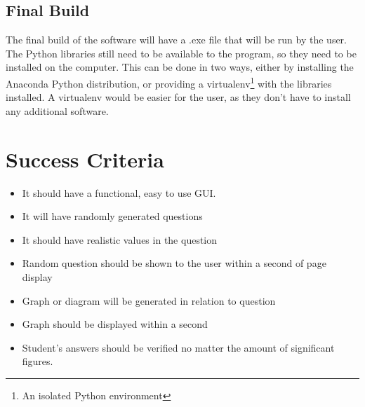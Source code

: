 \subsection{Final Build}
The final build of the software will have a .exe file that will be run by the user. The Python libraries still need to be available to the program, so they need to be installed on the computer. This can be done in two ways, either by installing the Anaconda Python distribution, or providing a virtualenv\footnote{An isolated Python environment} with the libraries installed. A virtualenv would be easier for the user, as they don't have to install any additional software.
\section{Success Criteria}
\begin{itemize}
	\item It should have a functional, easy to use GUI.
	\item It will have randomly generated questions
	\item It should have realistic values in the question
	\item Random question should be shown to the user within a second of page display
	\item Graph or diagram will be generated in relation to question
	\item Graph should be displayed within a second
	\item Student's answers should be verified no matter the amount of significant figures.
\end{itemize}